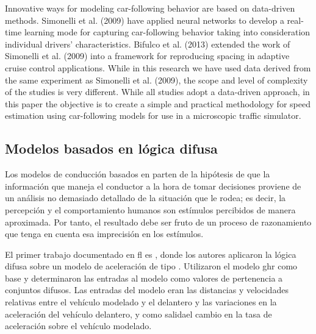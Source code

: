 Innovative ways for modeling car-following behavior are based on data-driven methods. Simonelli et al. (2009) have applied neural networks to develop a real-time learning mode for capturing car-following behavior taking into consideration individual drivers’ characteristics. Bifulco et al. (2013) extended the work of Simonelli et al. (2009) into a framework for reproducing spacing in adaptive cruise control applications. While in this research we have used data derived from the same experiment as Simonelli et al. (2009), the scope and level of complexity of the studies is very different. While all studies adopt a data-driven approach, in this paper the objective is to create a simple and practical methodology for speed estimation using car-following models for use in a microscopic traffic simulator.

\subsection{Modelos basados en lógica difusa}

Los modelos de conducción basados en  parten de la hipótesis de que la información que maneja el conductor a la hora de tomar decisiones proviene de un análisis no demasiado detallado de la situación que le rodea; es decir, la percepción y el comportamiento humanos son estímulos percibidos de manera aproximada. Por tanto, el resultado debe ser fruto de un proceso de razonamiento que tenga en cuenta esa imprecisión en los estímulos.

El primer trabajo documentado en \gls{fl} es \cite{Kikuchi1992}, donde los autores aplicaron la lógica difusa sobre un modelo de aceleración de tipo \textit{}. Utilizaron el modelo \gls{ghr} como base y determinaron las entradas al modelo como valores de pertenencia a conjuntos difusos. Las entradas del modelo eran las distancias y velocidades relativas entre el vehículo modelado y el delantero y las variaciones en la aceleración del vehículo delantero, y como salidael cambio en la tasa de aceleración sobre el vehículo modelado.

